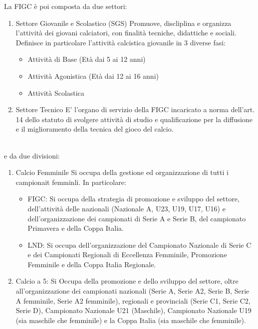\documentclass[../uefaC.tex]{subfiles}
\begin{document}
La FIGC è poi composta da due settori:
\begin{enumerate}
    \item{Settore Giovanile e Scolastico (SGS)} Promuove, discliplina e organizza l'attività dei giovani calciatori, con finalità tecniche, didattiche e sociali. Definisce in particolare l'attività calcistica giovanile in 3 diverse fasi:
    \begin{itemize}
        \item{Attività di Base} (Età dai 5 ai 12 anni)
        \item{Attività Agonistica} (Età dai 12 ai 16 anni)
        \item{Attività Scolastica}
    \end{itemize}
    \item{Settore Tecnico} E' l'organo di servizio della FIGC incaricato a norma dell'art. 14 dello statuto di svolgere attività di studio e qualificazione per la diffusione e il miglioramento della tecnica del gioco del calcio.
\end{enumerate}
\hfill \\
e da due divisioni:
\begin{enumerate}
    \item{Calcio Femminile} Si occupa della gestione ed organizzazione di tutti i campionait femminli. In particolare:
    \begin{itemize}
        \item{FIGC}: Si occupa della strategia di promozione e sviluppo del settore, dell'attività delle nazionali (Nazionale A, U23, U19, U17, U16) e dell'organizzazione dei campionati di Serie A e Serie B, del campionato Primavera e della Coppa Italia.
        \item{LND}: Si occupa dell'organizzazione del Campionato Nazionale di Serie C e dei Campionati Regionali di Eccellenza Femminile, Promozione Femminile e della Coppa Italia Regionale.
    \end{itemize}
    \item{Calcio a 5}: Si Occupa della promozione e dello sviluppo del settore, oltre all'organizzazione dei campionati nazionali (Serie A, Serie A2, Serie B, Serie A femminile, Serie A2 femminile), regionali e provinciali (Serie C1, Serie C2, Serie D), Campionato Nazionale U21 (Maschile), Campionato Nazionale U19 (sia maschile che femminile) e la Coppa Italia (sia maschile che femminile).
\end{enumerate}
\end{document}
